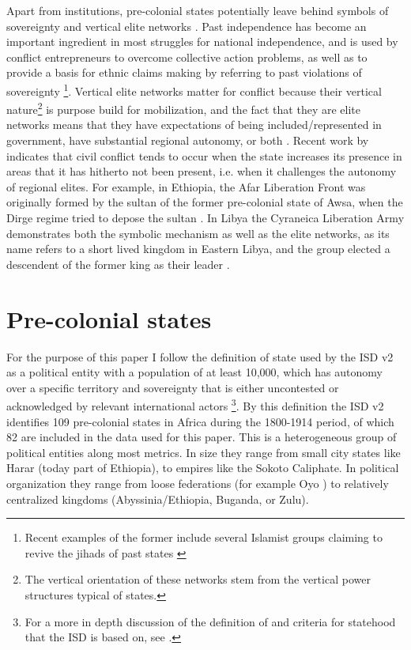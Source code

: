 \documentclass[12pt]{article}
\begin{document}
Apart from institutions, pre-colonial states potentially leave behind symbols of
sovereignty and vertical elite networks \citep{Wishman}. Past independence has
become an important ingredient in most struggles for national independence, and
is used by conflict entrepreneurs to overcome collective action problems, as
well as to provide a basis for ethnic claims making by referring to past
violations of sovereignty \citep{Ahram2019, Shelef2016}\footnote{Recent examples
	of the former include several Islamist groups claiming to revive the
	jihads of past states \citep{Zenn2015}}. Vertical elite networks matter
	for conflict because their vertical nature\footnote{The vertical
		orientation of these networks stem from the vertical power
	structures typical of states.} is purpose build for mobilization, and
	the fact that they are elite networks means that they have expectations
	of being included/represented in government, have substantial regional
	autonomy, or both \citep{Wishman}. Recent work by \citet{Ying_2020}
	indicates that civil conflict tends to occur when the state increases
	its presence in areas that it has hitherto not been present, i.e. when
	it challenges the autonomy of regional elites. For example, in Ethiopia,
	the Afar Liberation Front was originally formed by the sultan of the
	former pre-colonial state of Awsa, when the Dirge regime tried to depose
	the sultan \citep{Shehim1985, Hanfare2011}.  In Libya the Cyraneica
	Liberation Army demonstrates both the symbolic mechanism as well as the
	elite networks, as its name refers to a short lived kingdom in Eastern
	Libya, and the group elected a descendent of the former king as their
	leader \citep{Ahram2019}.


\section{Pre-colonial states}

For the purpose of this paper I follow the definition of state used by the ISD
v2 \citep{Butcher2020} as a political entity with a population of at least
10,000, which has autonomy over a specific territory and sovereignty that is
either uncontested or acknowledged by relevant international actors
\citep{Butcher2020}\footnote{For a more in depth discussion of the definition of
and criteria for statehood that the ISD is based on, see \citet{Butcher2017}.}.
By this definition the ISD v2 identifies 109 pre-colonial states in Africa
during the 1800-1914 period, of which 82 are included in the data used for this
paper. This is a heterogeneous group of political entities along most metrics.
In size they range from small city states like Harar (today part of Ethiopia),
to empires like the Sokoto Caliphate. In political organization they range from
loose federations (for example Oyo \citep{Law1977}) to relatively centralized
kingdoms (Abyssinia/Ethiopia, Buganda, or Zulu).
\end{document}

